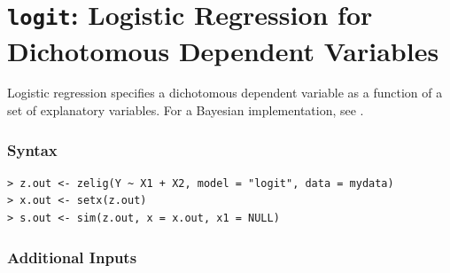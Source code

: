

\usepackage{Sweave}

\nobibliography*


\section{{\tt logit}: Logistic Regression for Dichotomous Dependent
Variables}\label{logit}

Logistic regression specifies a dichotomous dependent variable as a
function of a set of explanatory variables.  For a Bayesian
implementation, see .  

\subsubsection{Syntax}

\begin{verbatim}
> z.out <- zelig(Y ~ X1 + X2, model = "logit", data = mydata)
> x.out <- setx(z.out)
> s.out <- sim(z.out, x = x.out, x1 = NULL)
\end{verbatim}

\subsubsection{Additional Inputs} 

